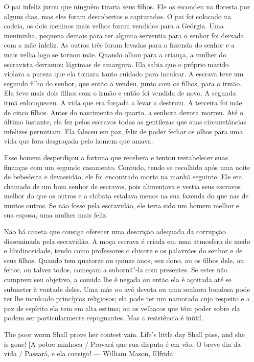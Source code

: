 O pai infeliz jurou que ninguém tiraria seus filhos. Ele os escondeu na
floresta por alguns dias, mas eles foram descobertos e capturados. O pai
foi colocado na cadeia, os dois meninos mais velhos foram vendidos para
a Geórgia. Uma menininha, pequena demais para ter alguma serventia para
o senhor foi deixada com a mãe infeliz. As outras três foram levadas
para a fazenda do senhor e a mais velha logo se tornou mãe. Quando olhou
para a criança, a mulher do escravista derramou lágrimas de amargura.
Ela sabia que o próprio marido violara a pureza que ela tomara tanto
cuidado para inculcar. A escrava teve um segundo filho do senhor, que
então a vendeu, junto com os filhos, para o irmão. Ela teve mais dois
filhos com o irmão e então foi vendida de novo. A segunda irmã
enlouqueceu. A vida que era forçada a levar a destruiu. A terceira foi
mãe de cinco filhos. Antes do nascimento do quarto, a senhora devota
morreu. Até o último instante, ela fez pelos escravos todas as
gentilezas que suas circunstâncias infelizes permitiam. Ela faleceu em
paz, feliz de poder fechar os olhos para uma vida que fora desgraçada
pelo homem que amava.

Esse homem desperdiçou a fortuna que
recebera e tentou restabelecer suas finanças com um segundo casamento.
Contudo, tendo se recolhido após uma noite de bebedeira e devassidão,
ele foi encontrado morto na manhã seguinte. Ele era chamado de um bom
senhor de escravos, pois alimentava e vestia seus escravos melhor do que
os outros e a chibata estalava menos na sua fazenda do que nas de muitos
outros. Se não fosse pela escravidão, ele teria sido um homem melhor e
sua esposa, uma mulher mais feliz.

Não há caneta que consiga oferecer uma
descrição adequada da corrupção disseminada pela escravidão. A moça
escrava é criada em uma atmosfera de medo e libidinosidade, tendo como
professores o chicote e os palavrões do senhor e de seus filhos. Quando
tem quatorze ou quinze anos, seu dono, ou os filhos dele, ou feitor, ou
talvez todos, começam a suborná"-la com presentes. Se estes não cumprem
seu objetivo, a comida lhe é negada ou então ela é açoitada até se
submeter à vontade deles. Uma mãe ou avó devota ou uma senhora bondosa
pode ter lhe inculcado princípios religiosos; ela pode ter um namorado
cujo respeito e a paz de espírito ela tem em alta estima; ou os velhacos
que têm poder sobre ela podem ser particularmente repugnantes. Mas a
resistência é inútil.

The poor worm Shall prove her contest vain. Life's little day Shall
pass, and she is gone! {[}A pobre minhoca / Provará que sua disputa é em
vão. O breve dia da vida / Passará, e ela consigo! --- William Mason,
Elfrida{]}

